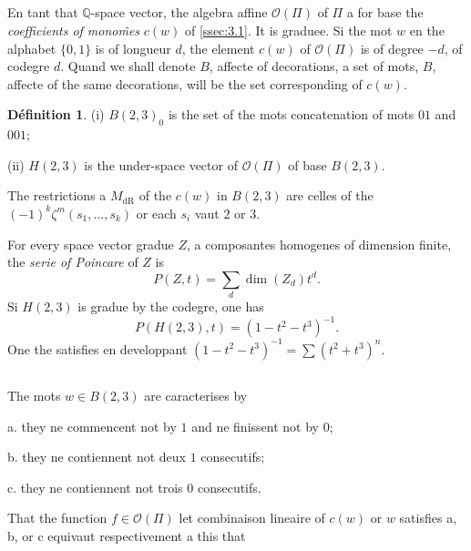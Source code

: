 \documentclass[11pt,a4paper]{article}
\theoremstyle{plain}
\theoremstyle{definition}
\newtheorem{definition}[theorem]{D\'efinition}
\newcommand{\Q}{\mathbb{Q}}
\newcommand{\dR}{\mathrm{dR}}
\begin{document}
\subsection{}\label{ssec:6.1}

En tant that $\Q$-space vector, the algebra affine $\mathcal{O}(\Pi)$ of $\Pi$ a for base the \emph{coefficients of mono\^mes} $c(w)$ of \ref{ssec:3.1}. It is graduee. Si the mot $w$ en the alphabet $\{0,1\}$ is of longueur $d$, the element $c(w)$ of $\mathcal{O}(\Pi)$ is of degree $-d$, of codegre $d$. Quand we shall denote $B$, affecte of decorations, a set of mots, $B$, affecte of the same decorations, will be the set corresponding of $c(w)$.

\begin{definition}\label{def:6.2}
(i) $B(2,3)_0$ is the set of the mots concatenation of mots $01$ and $001$;

(ii) $H(2,3)$ is the under-space vector of $\mathcal{O}(\Pi)$ of base $B(2,3)$.
\end{definition}

The restrictions a $M_{\dR}$ of the $c(w)$ in $B(2,3)$ are celles of the $(-1)^k \zeta^m(s_1,\ldots,s_k)$ or each $s_i$ vaut $2$ or $3$.

For every space vector gradue $Z$, a composantes homogenes of dimension finite, the \emph{serie of Poincare} of $Z$ is
\begin{equation}\label{eq:6.2.1}
P(Z,t) = \sum_d \dim(Z_d) t^d.
\end{equation}
Si $H(2,3)$ is gradue by the codegre, one has
\begin{equation}\label{eq:6.2.2}
P(H(2,3),t) = (1 - t^2 - t^3)^{-1}.
\end{equation}
One the satisfies en developpant $(1 - t^2 - t^3)^{-1} = \sum (t^2 + t^3)^n$.

\subsection{}\label{ssec:6.3}

The mots $w \in B(2,3)$ are caracterises by

a. they ne commencent not by $1$ and ne finissent not by $0$;

b. they ne contiennent not deux $1$ consecutifs;

c. they ne contiennent not trois $0$ consecutifs.

That the function $f \in \mathcal{O}(\Pi)$ let combinaison lineaire of $c(w)$ or $w$ satisfies a, b, or c equivaut respectivement a this that
\end{document}
